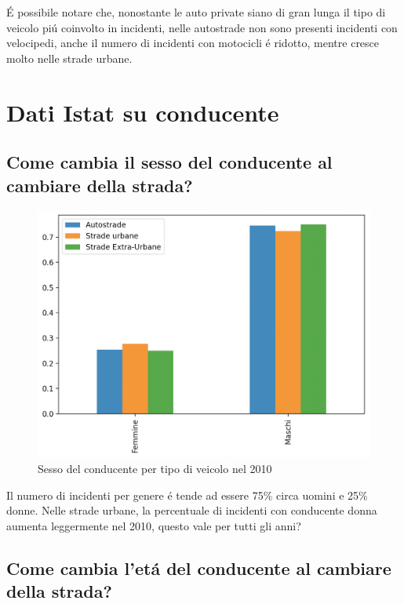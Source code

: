 \documentclass[a4paper]{report}
\begin{document}
\'E possibile notare che, nonostante le auto private siano di gran lunga il tipo di veicolo 
pi\'u coinvolto in incidenti, nelle autostrade non sono presenti incidenti con velocipedi, 
anche il numero di incidenti con motocicli \'e ridotto, mentre cresce molto nelle strade urbane.


\clearpage
\section{Dati Istat su conducente}

\clearpage
\subsection{Come cambia il sesso del conducente al cambiare della strada?}

\begin{figure}[!ht]
    \includegraphics[width=\linewidth]{../src/incidenti/incidenti_senza_coords/tipo_veicoli/uomo-donna.png}
    \caption{Sesso del conducente per tipo di veicolo nel 2010}
    \label{fig:differenza_uomo_donna}
\end{figure}

Il numero di incidenti per genere \'e tende ad essere 75\% circa uomini e 25\% donne.
Nelle strade  urbane, la percentuale di incidenti con conducente donna aumenta leggermente nel 2010, 
questo vale per tutti gli anni?



\clearpage
\subsection{Come cambia l'et\'a del conducente al cambiare della strada?}
\end{document}
